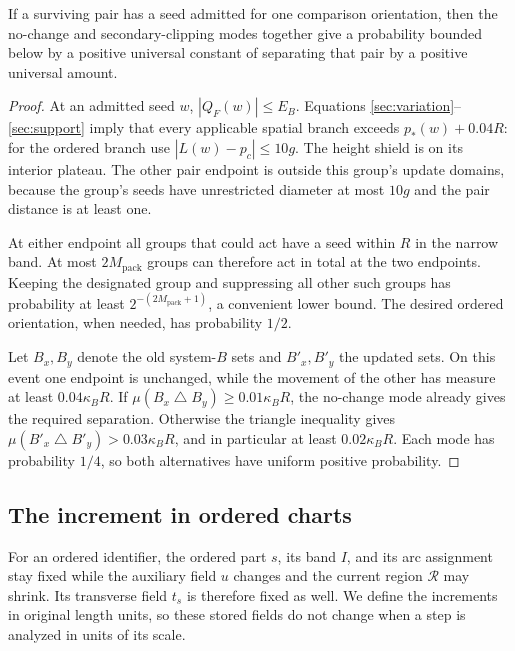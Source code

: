 \begin{lemma}\label{sec:admitted-success}
If a surviving pair has a seed admitted for one comparison orientation,
then the no-change and secondary-clipping modes together give a probability
bounded below by a positive universal constant of separating that pair by
a positive universal amount.
\end{lemma}
\begin{proof}
At an admitted seed $w$, $|Q_F(w)|\le E_B$. Equations
\eqref{sec:variation}--\eqref{sec:support} imply that every applicable
spatial branch exceeds $p_*(w)+0.04R$: for the ordered branch use
$|L(w)-p_c|\le10g$. The height shield is on its interior plateau.
The other pair endpoint is outside this group's update domains, because
the group's seeds have unrestricted diameter at most $10g$ and the pair
distance is at least one.

At either endpoint all groups that could act have a seed within $R$ in
the narrow band. At most $2M_{\mathrm{pack}}$ groups can therefore act in total at the two endpoints.
Keeping the designated group and suppressing all other such groups has
probability at least $2^{-(2M_{\mathrm{pack}}+1)}$, a convenient lower bound. The desired ordered orientation,
when needed, has probability $1/2$.

Let $B_x,B_y$ denote the old system-$B$ sets and $B'_x,B'_y$ the updated sets.
On this event one endpoint is unchanged, while the movement of the other
has measure at least $0.04\kappa_BR$. If
$\mu(B_x\mathbin\triangle B_y)\ge0.01\kappa_BR$, the no-change mode
already gives the required separation. Otherwise the triangle inequality
gives $\mu(B'_x\mathbin\triangle B'_y)>0.03\kappa_BR$, and in
particular at least $0.02\kappa_BR$.
Each mode has probability $1/4$, so both alternatives have uniform
positive probability.
\end{proof}

\subsection{The increment in ordered charts}\label{sec:increment}
For an ordered identifier, the ordered part $s$, its band $I$, and its
arc assignment stay fixed while the auxiliary field $u$ changes and the
current region $\mathcal R$ may shrink. Its transverse field $t_s$ is
therefore fixed as well. We define the increments in original length
units, so these stored fields do not change when a step is analyzed in
units of its scale.

